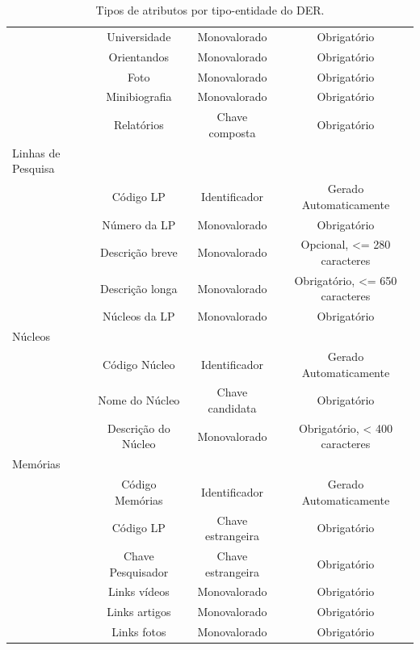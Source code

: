 \documentclass[11pt]{../../classes/ifscarticle}
\begin{document}
\begin{table}[h]
\begin{tabular}{l|c|c|c|}
                  & Universidade        & Monovalorado    & Obrigatório                                          \\
                  & Orientandos         & Monovalorado    & Obrigatório                                          \\
                  & Foto                & Monovalorado    & Obrigatório                                          \\
                  & Minibiografia       & Monovalorado    & Obrigatório                                          \\
                  & Relatórios          & Chave composta  & Obrigatório                                          \\
    \hline
    Linhas de Pesquisa \\
                  & Código LP       & Identificador & Gerado Automaticamente         \\
                  & Número da LP    & Monovalorado  & Obrigatório                    \\
                  & Descrição breve & Monovalorado  & Opcional, <= 280 caracteres    \\
                  & Descrição longa & Monovalorado  & Obrigatório, <= 650 caracteres \\
                  & Núcleos da LP   & Monovalorado  & Obrigatório                    \\
    \hline
    Núcleos \\
                  & Código Núcleo       & Identificador   & Gerado Automaticamente        \\
                  & Nome do Núcleo      & Chave candidata & Obrigatório                   \\
                  & Descrição do Núcleo & Monovalorado    & Obrigatório, < 400 caracteres \\
    \hline
    Memórias \\
                  & Código Memórias     & Identificador     & Gerado Automaticamente \\
                  & Código LP           & Chave estrangeira & Obrigatório            \\
                  & Chave Pesquisador   & Chave estrangeira & Obrigatório            \\
                  & Links vídeos        & Monovalorado      & Obrigatório            \\
                  & Links artigos       & Monovalorado      & Obrigatório            \\
                  & Links fotos         & Monovalorado      & Obrigatório            \\
    \hline
  \end{tabular}
  \caption{Tipos de atributos por tipo-entidade do DER.}
\end{table}




\end{document}
